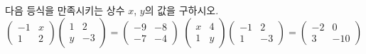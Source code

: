 다음 등식을 만족시키는 상수 $x$, $y$의 값을 구하시오.
 $\begin{pmatrix} -1 & x \\ 1 & 2 \end{pmatrix}\begin{pmatrix} 1 & 2 \\ y & -3 \end{pmatrix}=\begin{pmatrix} -9 & -8 \\ -7 & -4 \end{pmatrix}$
 $\begin{pmatrix} x & 4 \\ 1 & y \end{pmatrix}\begin{pmatrix} -1 & 2 \\ 1 & -3 \end{pmatrix}=\begin{pmatrix} -2 & 0 \\ 3 & -10 \end{pmatrix}$
